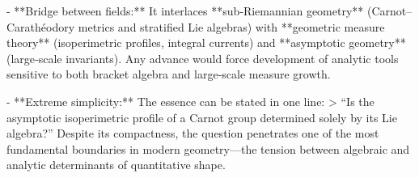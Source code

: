 - **Bridge between fields:**  
  It interlaces **sub‑Riemannian geometry** (Carnot–Carathéodory metrics and stratified Lie algebras) with **geometric measure theory** (isoperimetric profiles, integral currents) and **asymptotic geometry** (large‑scale invariants). Any advance would force development of analytic tools sensitive to both bracket algebra and large‑scale measure growth.

- **Extreme simplicity:**  
  The essence can be stated in one line:
  > “Is the asymptotic isoperimetric profile of a Carnot group determined solely by its Lie algebra?”  
  Despite its compactness, the question penetrates one of the most fundamental boundaries in modern geometry—the tension between algebraic and analytic determinants of quantitative shape.
